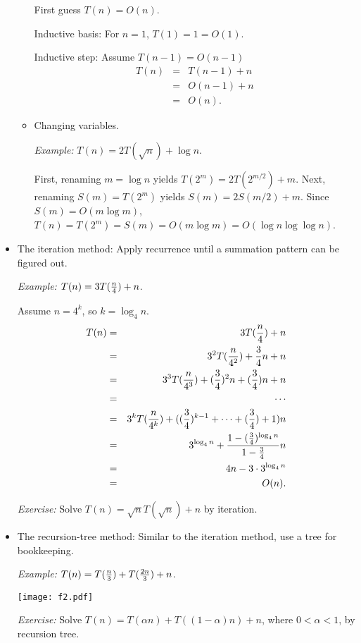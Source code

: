 \documentclass{article}
\begin{document}
\begin{itemize}
\begin{itemize}
First guess $T(n)=O(n)$.

Inductive basis: For $n=1$, $T(1)=1=O(1)$.

Inductive step: Assume $T(n-1)=O(n-1)$
\begin{eqnarray*}
T(n)&=&T(n-1)+n\\
&=&O(n-1)+n\\
&=&O(n).
\end{eqnarray*}
\item Changing variables.

{\em Example:} $T(n)=2T(\sqrt{n})+\log n$. 

First, renaming $m=\log n$ yields $T(2^m)=2T(2^{m/2})+m$.
Next, renaming $S(m)=T(2^m)$ yields $S(m)=2S(m/2)+m$. 
Since $S(m)=O(m\log m)$, $T(n)=T(2^m)=S(m)=O(m\log m)=O(\log n\log\log n)$.
\end{itemize}

\item The iteration method: Apply recurrence until a summation pattern 
can be figured out.

{\em Example:} $T(n)=3T({n\over4})+n$.

Assume $n=4^k$, so $k=\log_4 n$.
\begin{eqnarray*}
T(n)&=&3T({n\over4})+n\\
&=&3^2T({n\over{4^2}})+{3\over4}n+n\\
&=&3^3T({n\over{4^3}})+({3\over4})^2n+({3\over4})n+n\\
&=&\cdots\\
&=&3^kT({n\over{4^k}})+(({3\over4})^{k-1}+\cdots+({3\over4})+1)n\\
&=&3^{\log_4 n}+{{1-({3\over4})^{\log_4 n}}\over{1-{3\over4}}}n\\
&=&4n-3\cdot 3^{\log_4 n}\\
&=&O(n).
\end{eqnarray*}

{\em Exercise:} Solve $T(n)=\sqrt nT(\sqrt n)+n$ by iteration.

\item The recursion-tree method: 
Similar to the iteration method, use a tree for bookkeeping.

{\em Example:} $T(n)=T({n\over3})+T({2n\over3})+n$.

\vskip 0.25cm
\begin{center}
\texttt{[image: f2.pdf]}
\end{center}

{\em Exercise:} Solve $T(n)=T(\alpha n)+T((1-\alpha)n)+n$, where
$0<\alpha<1$, by recursion tree.


\end{itemize}
\end{document}
